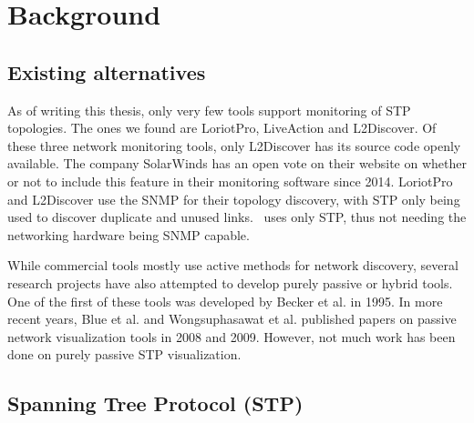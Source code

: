 \chapter{Background}
\label{background}
\section{Existing alternatives}
As of writing this thesis, only very few tools support monitoring of STP topologies.
The ones we found are LoriotPro\cite{LoriotPro}, LiveAction\cite{LiveAction} and L2Discover\cite{L2Discover}.
Of these three network monitoring tools, only L2Discover has its source code openly available.
The company SolarWinds has an open vote on their website on whether or not to include this feature in their monitoring software since 2014\cite{thwackSW}.
LoriotPro and L2Discover use the SNMP for their topology discovery, with STP only being used to discover duplicate and unused links.
\tool\ uses only STP, thus not needing the networking hardware being SNMP capable.

While commercial tools mostly use active methods for network discovery, several research projects have also attempted to develop purely passive or hybrid tools.
One of the first of these tools was developed by Becker et al.\cite{becker1995} in 1995.
In more recent years, Blue et al.\cite{blue2008} and Wongsuphasawat et al.\cite{wongsuphasawat2009} published papers on passive network visualization tools in 2008 and 2009.
However, not much work has been done on purely passive STP visualization.

\section{Spanning Tree Protocol (STP)}
\label{stp}
